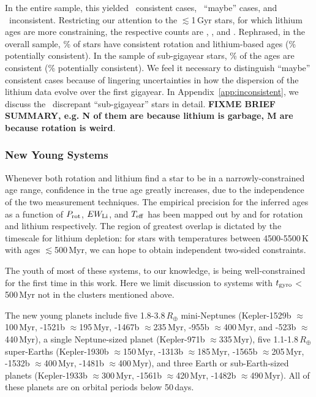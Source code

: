 \documentclass[11pt,twocolumn,tighten]{aastex63}
\begin{document}
In the entire sample, this yielded \allagesyesconsistent\ consistent
cases, \allagesmaybeconsistent\ ``maybe'' cases, and
\allagesnoconsistent\ inconsistent.  Restricting our attention to the
$\lesssim$1\,Gyr stars, for which lithium ages are more constraining,
the respective counts are \minageltonegyryesconsistent,
\minageltonegyrmaybeconsistent, and \minageltonegyrnoconsistent.
Rephrased, in the overall sample, \fracconsistentallages\% of stars
have consistent rotation and lithium-based ages
(\fracpotentiallyconsistentallages\% potentially consistent).  In the
sample of sub-gigayear stars, \fracconsistentminageltonegyr\% of the
ages are consistent (\fracpotentiallyconsistentminageltonegyr\%
potentially consistent).  We feel it necessary to distinguish
``maybe'' consistent cases because of lingering uncertainties in how
the dispersion of the lithium data evolve over the first gigayear.  In
Appendix~\ref{app:inconsistent}, we discuss the
\minageltonegyrnoconsistent\ discrepant ``sub-gigayear'' stars in detail.
{\bf FIXME BRIEF SUMMARY, e.g. N of them are because lithium is garbage,
	M are because rotation is weird}.


\subsubsection{New Young Systems}
%
Whenever both rotation and lithium find a star to be in a
narrowly-constrained age range, confidence in the true age greatly
increases, due to the independence of the two measurement techniques.
The empirical precision for the inferred ages as a function of $P_{\rm
rot}$, $EW_{\rm Li}$, and $T_{\rm eff}$ has been mapped out by
\citet{Bouma_2023} and \citet{Jeffries_2023} for rotation and lithium
respectively.  The region of greatest overlap is dictated by the
timescale for lithium depletion: for stars with temperatures between
4500-5500\,K with ages $\lesssim$500\,Myr, we can hope to obtain
independent two-sided constraints.

The youth of most of these systems, to our knowledge, is being
well-constrained for the first time in this work.  Here we limit
discussion to systems with $t_{\rm gyro}$$<$500\,Myr not in the clusters
mentioned above.

The new young planets
include five 1.8-3.8\,$R_\oplus$ mini-Neptunes
(Kepler-1529b $\approx$100\,Myr,
-1521b $\approx$195\,Myr,
-1467b $\approx$235\,Myr,
-955b $\approx$400\,Myr, and
-523b $\approx$440\,Myr),
a single Neptune-sized planet
(Kepler-971b $\approx$335\,Myr),
five 1.1-1.8\,$R_\oplus$ super-Earths
(Kepler-1930b $\approx$150\,Myr,
-1313b $\approx$185\,Myr,
-1565b $\approx$205\,Myr,
-1532b $\approx$400\,Myr,
-1481b $\approx$400\,Myr),
and three Earth or sub-Earth-sized planets
(Kepler-1933b $\approx$300\,Myr,
-1561b $\approx$420\,Myr,
-1482b $\approx$490\,Myr).
All of these planets are on orbital periods below 50\,days.
\end{document}
